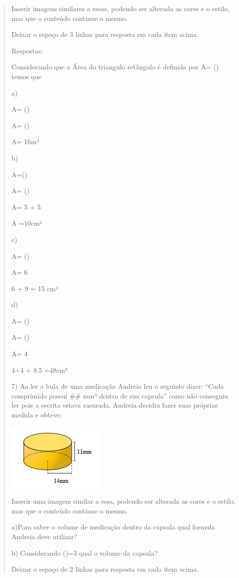 \begin{quote}
\begin{escolha}
Inserir imagens similares a essas, podendo ser alterada as cores e o
estilo, mas que o conteúdo continue o mesmo.

Deixar o espaço de 3 linhas para resposta em cada item acima.

Respostas:

Considerando que a Área do triangulo retângulo é definida por A=
() temos que

a)

A= ()

A= ()

A= 16m²

b)

A=()

A= ()

A= 5 + 5

A =10cm²

c)

A= ()

A= 6

6 + 9 = 15 cm²

d)

A= ()

A= ()

A= 4

4+4 + 8.5 =48cm²

7) Ao ler a bula de uma medicação Andreia leu o seguinte dizer: ``Cada
comprimido possui \#\# mm³ dentro de sua capsula'' como não conseguiu
ler pois a escrita estava rasurada, Andreia decidiu fazer suas próprias
medida e obteve:

\includegraphics[width=1.88542in,height=1.3125in]{./imgSAEB_8_MAT/media/image50.png}

Inserir uma imagem similar a essa, podendo ser alterada as cores e o
estilo, mas que o conteúdo continue o mesmo.

a)Para saber o volume de medicação dentro da capsula qual formula
Andreia deve utilizar?

b) Considerando (\Pi)=3 qual o volume da capsula?

Deixar o espaço de 2 linhas para resposta em cada item acima.


\end{escolha}
\end{quote}
